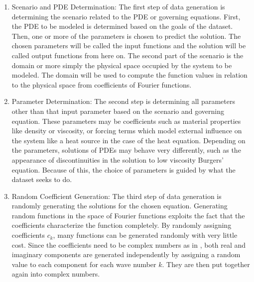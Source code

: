 \begin{enumerate}
  \item Scenario and PDE Determination:
        The first step of data generation is determining the scenario related to the PDE or governing equations. First, the PDE to be modeled is determined based on the goals of the dataset. Then, one or more of the parameters is chosen to predict the solution. The chosen parameters will be called the input functions and the solution will be called output functions from here on. The second part of the scenario is the domain or more simply the physical space occupied by the system to be modeled. The domain will be used to compute the function values in relation to the physical space from coefficients of Fourier functions.
  \item Parameter Determination:
        The second step is determining all parameters other than that input parameter based on the scenario and governing equation. These parameters may be coefficients such as material properties like density or viscosity, or forcing terms which model external influence on the system like a heat source in the case of the heat equation. Depending on the parameters, solutions of PDEs may behave very differently, such as the appearance of discontinuities in the solution to low viscosity Burgers' equation. Because of this, the choice of parameters is guided by what the dataset seeks to do.
  \item Random Coefficient Generation:
        The third step of data generation is randomly generating the solutions for the chosen equation. Generating random functions in the space of Fourier functions exploits the fact that the coefficients characterize the function completely. By randomly assigning coefficients \(c_k\), many functions can be generated randomly with very little cost. Since the coefficients need to be complex numbers as in , both real and imaginary components are generated independently by assigning a random value to each component for each wave number \(k\). They are then put together again into complex numbers.


\end{enumerate}
